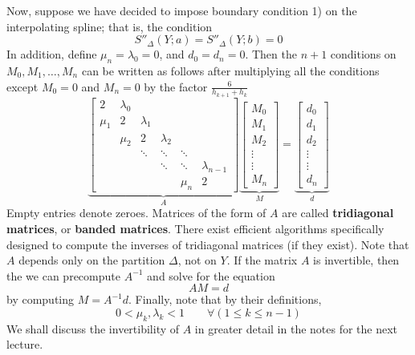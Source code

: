 Now, suppose we have decided to impose boundary condition 1) on the interpolating spline; that is, the condition
\[
  S''_\Delta(Y ; a) = S''_\Delta(Y ; b) = 0
\]
In addition, define $\mu_n = \lambda_0 = 0$, and $d_0 = d_n = 0$. Then the $n+1$ conditions on $M_0, M_1, \dots , M_n$ can be written as follows after multiplying all the conditions except $M_0 = 0$ and $M_n = 0$ by the factor $\frac{6}{h_{k+1} + h_k}$ 
\[
  \underbrace{
    \begin{bmatrix}
      2 & \lambda_0 & & & &                     \\[5pt]
      \mu_1 & 2 & \lambda_1 & & &               \\[5pt]
      & \mu_2 & 2 & \lambda_2 & &              \\[5pt]
      & & \ddots & \ddots & \ddots &           \\[5pt]
      & & & \ddots & \ddots & \lambda_{n-1}     \\[5pt]
      & & & &  \mu_n & 2
    \end{bmatrix}
  }_A
  \underbrace{
    \begin{bmatrix}
      M_0 \\[5pt] M_1 \\[5pt] M_2 \\[5pt] \vdots \\[5pt] \vdots \\[5pt] M_n
    \end{bmatrix}
  }_M
  =
  \underbrace{
    \begin{bmatrix}
      d_0 \\[5pt] d_1 \\[5pt] d_2 \\[5pt] \vdots \\[5pt] \vdots \\[5pt] d_n
    \end{bmatrix}
  }_d
\]
Empty entries denote zeroes. Matrices of the form of $A$ are called \textbf{tridiagonal matrices}, or \textbf{banded matrices}. There exist efficient algorithms specifically designed to compute the inverses of tridiagonal matrices (if they exist). Note that $A$ depends only on the partition $\Delta$, not on $Y$. If the matrix $A$ is invertible, then the we can precompute $A^{-1}$ and solve for the equation
\[
  AM = d
\]
by computing $M = A^{-1}d$. Finally, note that by their definitions,
\[
  0 < \mu_k, \lambda_k < 1 \qquad \forall(1 \leq k \leq n-1)
\]
We shall discuss the invertibility of $A$ in greater detail in the notes for the next lecture.

